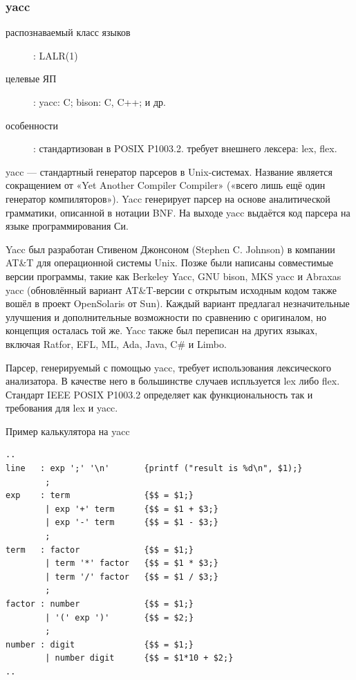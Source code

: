 \documentclass[a4paper,12pt]{article}
\begin{document}
\subsubsection{yacc}
\begin{description}
  \item[распознаваемый класс языков]: LALR(1)
  \item[целевые ЯП]: yacc: C; bison: C, C++; и др.
  \item[особенности]: стандартизован в POSIX P1003.2. требует внешнего лексера: lex, flex.
\end{description}
yacc — стандартный генератор парсеров в Unix-системах. Название является
сокращением от «Yet Another Compiler Compiler» («всего лишь ещё один генератор
компиляторов»). Yacc генерирует парсер на основе аналитической грамматики,
описанной в нотации BNF. На выходе yacc выдаётся код парсера на языке
программирования Си.

Yacc был разработан Стивеном Джонсоном (Stephen C. Johnson) в компании AT\&T
для операционной системы Unix. Позже были написаны совместимые версии
программы, такие как Berkeley Yacc, GNU bison, MKS yacc и Abraxas yacc
(обновлённый вариант AT\&T-версии с открытым исходным кодом также вошёл в
проект OpenSolaris от Sun). Каждый вариант предлагал незначительные улучшения и
дополнительные возможности по сравнению с оригиналом, но концепция осталась той
же. Yacc также был переписан на других языках, включая Ratfor, EFL, ML, Ada,
Java, C\# и Limbo.

Парсер, генерируемый с помощью yacc, требует использования лексического
анализатора. В качестве него в большинстве случаев испльзуется lex либо
flex. Стандарт IEEE POSIX P1003.2 определяет как функциональность так и
требования для lex и yacc.

\begin{example}
Пример калькулятора на yacc
\end{example}
\begin{verbatim}
..
line   : exp ';' '\n'       {printf ("result is %d\n", $1);}
        ;
exp    : term               {$$ = $1;}
        | exp '+' term      {$$ = $1 + $3;}
        | exp '-' term      {$$ = $1 - $3;}
        ;
term   : factor             {$$ = $1;}
        | term '*' factor   {$$ = $1 * $3;}
        | term '/' factor   {$$ = $1 / $3;}
        ;
factor : number             {$$ = $1;}
        | '(' exp ')'       {$$ = $2;}
        ;
number : digit              {$$ = $1;}
        | number digit      {$$ = $1*10 + $2;}
..
\end{verbatim}
\end{document}

